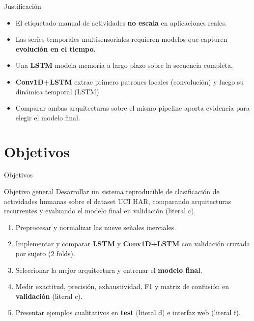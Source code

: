 \documentclass[aspectratio=169]{beamer}
\begin{document}
\begin{frame}{Justificación}
  \begin{itemize}
    \item El etiquetado manual de actividades \textbf{no escala} en aplicaciones reales.
    \item Las series temporales multisensoriales requieren modelos que capturen \textbf{evolución en el tiempo}.
    \item Una \textbf{LSTM} modela memoria a largo plazo sobre la secuencia completa.
    \item \textbf{Conv1D+LSTM} extrae primero patrones locales (convolución) y luego su dinámica temporal (LSTM).
    \item Comparar ambas arquitecturas sobre el mismo pipeline aporta evidencia para elegir el modelo final.
  \end{itemize}
\end{frame}

\section{Objetivos}

\begin{frame}{Objetivos}
  \begin{block}{Objetivo general}
    Desarrollar un sistema reproducible de clasificación de actividades humanas sobre el dataset UCI HAR, comparando arquitecturas recurrentes y evaluando el modelo final en validación (literal c).
  \end{block}
  \begin{enumerate}
    \item Preprocesar y normalizar las nueve señales inerciales.
    \item Implementar y comparar \textbf{LSTM} y \textbf{Conv1D+LSTM} con validación cruzada por sujeto ($2$ folds).
    \item Seleccionar la mejor arquitectura y entrenar el \textbf{modelo final}.
    \item Medir exactitud, precisión, exhaustividad, F1 y matriz de confusión en \textbf{validación} (literal c).
    \item Presentar ejemplos cualitativos en \textbf{test} (literal d) e interfaz web (literal f).
  \end{enumerate}
\end{frame}

\end{document}
